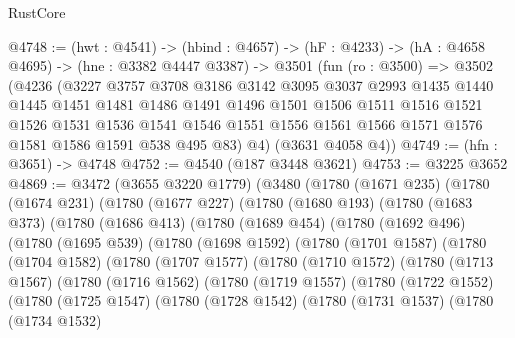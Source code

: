\begin{lexlean}{RustCore}
\begin{coremodule}
@4748 := (hwt : @4541) ->
  (hbind : @4657) ->
  (hF : @4233) ->
  (hA : @4658 @4695) ->
  (hne : @3382 @4447 @3387) ->
  @3501
    (fun (ro : @3500) =>
    @3502
      (@4236
        (@3227
          @3757
          @3708
          @3186
          @3142
          @3095
          @3037
          @2993
          @1435
          @1440
          @1445
          @1451
          @1481
          @1486
          @1491
          @1496
          @1501
          @1506
          @1511
          @1516
          @1521
          @1526
          @1531
          @1536
          @1541
          @1546
          @1551
          @1556
          @1561
          @1566
          @1571
          @1576
          @1581
          @1586
          @1591
          @538
          @495
          @83)
        @4)
      (@3631 @4058 @4))
@4749 := (hfn : @3651) -> @4748
@4752 := @4540 (@187 @3448 @3621)
@4753 := @3225 @3652
@4869 := @3472
    (@3655 @3220 @1779)
    (@3480
      (@1780
        (@1671 @235)
        (@1780
          (@1674 @231)
          (@1780
            (@1677 @227)
            (@1780
              (@1680 @193)
              (@1780
                (@1683 @373)
                (@1780
                  (@1686 @413)
                  (@1780
                    (@1689 @454)
                    (@1780
                      (@1692 @496)
                      (@1780
                        (@1695 @539)
                        (@1780
                          (@1698 @1592)
                          (@1780
                            (@1701 @1587)
                            (@1780
                              (@1704 @1582)
                              (@1780
                                (@1707 @1577)
                                (@1780
                                  (@1710 @1572)
                                  (@1780
                                    (@1713 @1567)
                                    (@1780
                                      (@1716 @1562)
                                      (@1780
                                        (@1719 @1557)
                                        (@1780
                                          (@1722 @1552)
                                          (@1780
                                            (@1725 @1547)
                                            (@1780
                                              (@1728 @1542)
                                              (@1780
                                                (@1731 @1537)
                                                (@1780
                                                  (@1734 @1532)

\end{coremodule}
\end{lexlean}
